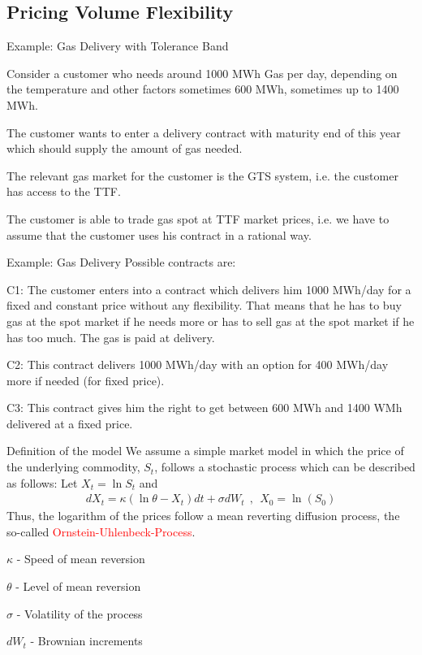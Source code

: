 \subsection{Pricing Volume Flexibility}

{Example: Gas Delivery with Tolerance Band}
\item<1-> Consider a customer who needs around 1000 MWh Gas per day, depending on the temperature and other factors sometimes 600 MWh, sometimes up to 1400 MWh.
\item<2-> The customer wants to enter a delivery contract with maturity end of this year which should supply the amount of gas needed.
\item<3-> The relevant gas market for the customer is the GTS system, i.e. the customer has access to the TTF.
\item<3-> The customer is able to trade gas spot at TTF market prices, i.e. we have to assume that the customer uses his contract in a rational way.

{Example: Gas Delivery}
Possible contracts are:
\item<1->  C1: The customer enters into a contract which delivers him 1000 MWh/day for a fixed and constant price without any flexibility. That means that he has to buy gas at the spot market if he needs more or has to sell gas at the spot market if he has too much. The gas is paid at delivery.
\item<2-> C2: This contract delivers 1000 MWh/day with an option for 400 MWh/day more if needed (for fixed price).
\item<3-> C3: This contract gives him the right to get between 600 MWh and 1400 WMh delivered at a fixed price.

{Definition of the model}
We assume a simple market model in which the price of the underlying commodity, $S_t$, follows a stochastic process which can be described as follows:
Let $X_t = \ln S_t$ and
\begin{align*}
	dX_t = \kappa (\ln \theta - X_t)dt + \sigma dW_t~~,~~X_0 = \ln(S_0)
\end{align*}
Thus, the logarithm of the prices follow a mean reverting diffusion process, the so-called \textcolor{red}{Ornstein-Uhlenbeck-Process}.\\
\item $\kappa$ - Speed of mean reversion
\item $\theta$ - Level of mean reversion
\item $\sigma$ - Volatility of the process
\item $dW_t$ - Brownian increments


